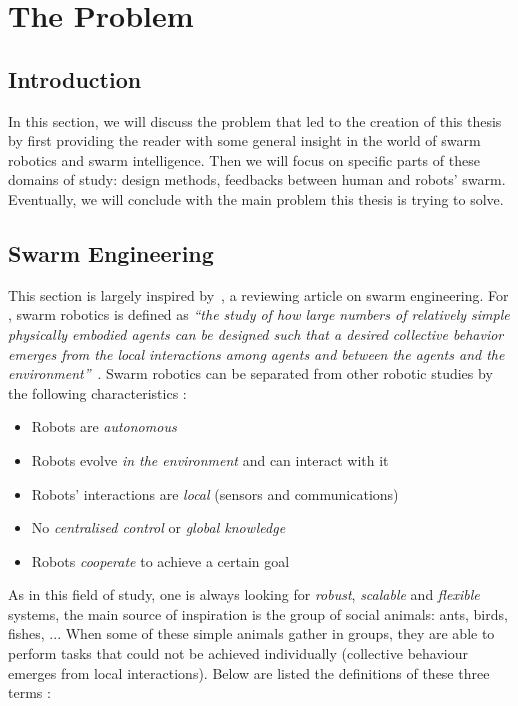 \documentclass[a4paper, 12pt]{report}
\newcommand{\quot}[1]{\textit{\enquote{#1}}}
\begin{document}
\chapter{The Problem}
	\section{Introduction}
	
	In this section, we will discuss the problem that led to the creation of this thesis by first providing the reader with some general insight in the world of swarm robotics and swarm intelligence. Then we will focus on specific parts of these domains of study: design methods, feedbacks between human and robots' swarm. Eventually, we will conclude with the main problem this thesis is trying to solve.
	
	\section{Swarm Engineering}
	
	This section is largely inspired by~\citet{brambilla2013swarm}, a reviewing article on swarm engineering. For \citet{csahin2005swarm}, swarm robotics is defined as \quot{the study of how large numbers of relatively simple physically embodied agents can be designed such that a desired collective behavior emerges from the local interactions among agents and between the agents and the environment}~\citep{csahin2005swarm}. Swarm robotics can be separated from other robotic studies by the following characteristics \citep{brambilla2013swarm}:
	
\begin{itemize}
\item Robots are \emph{autonomous}
\item Robots evolve \emph{in the environment} and can interact with it
\item Robots' interactions are \emph{local} (sensors and communications)
\item No \emph{centralised control} or \emph{global knowledge}
\item Robots \emph{cooperate} to achieve a certain goal
\end{itemize}

As in this field of study, one is always looking for \emph{robust}, \emph{scalable} and \emph{flexible} systems, the main source of inspiration is the group of social animals: ants, birds, fishes, ... When some of these simple animals gather in groups, they are able to perform tasks that could not be achieved individually (collective behaviour emerges from local interactions). Below are listed the definitions of these three terms \citep{brambilla2013swarm}:
\end{document}
